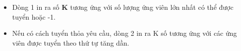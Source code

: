 \begin{itemize}
	\item Dòng 1 in ra số \textbf{ K } tương ứng với số lượng ứng viên lớn nhất có thể được tuyển hoặc -1.
	\item Nếu có cách tuyển thỏa yêu cầu, dòng 2 in ra K số tương ứng với các ứng viên được tuyển theo thứ tự tăng dần.
\end{itemize}